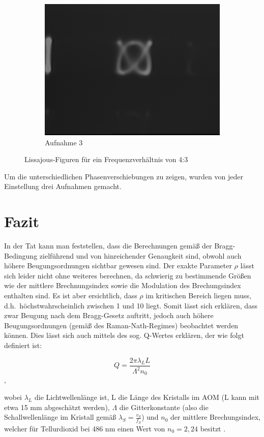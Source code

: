 \documentclass[bigchapter,colorback,accentcolor=tud4b,linedtoc,11pt]{tudreport}
\begin{document}
\begin{figure}[H]
\begin{subfigure}[h]{0.32\textwidth}
    \includegraphics[width=\textwidth]{data/Aufgabe7/4-3-y.png}
    \caption[Cap for listoffigures]{Aufnahme 3}
  \end{subfigure}%
  \caption{Lissajous-Figuren für ein Frequenzverhältnis von 4:3}
\end{figure}

Um die unterschiedlichen Phasenverschiebungen zu zeigen, wurden von jeder Einstellung drei Aufnahmen gemacht.


\chapter{Fazit}

In der Tat kann man feststellen, dass die Berechnungen gemäß der Bragg-Bedingung zielführend und von hinreichender Genaugkeit sind, obwohl auch höhere Beugungsordnungen sichtbar gewesen sind. Der exakte Parameter $\rho$ lässt sich leider nicht ohne weiteres berechnen, da schwierig zu bestimmende Größen wie der mittlere Brechnungsindex sowie die Modulation des Brechungsindex enthalten sind. Es ist aber ersichtlich, dass $\rho$ im kritischen Bereich liegen muss, d.h.\ höchstwahrscheinlich zwischen 1 und 10 liegt. Somit lässt sich erklären, dass zwar Beugung nach dem Bragg-Gesetz auftritt, jedoch auch höhere Beugungsordnungen (gemäß des Raman-Nath-Regimes) beobachtet werden können. Dies lässt sich auch mittels des sog. Q-Wertes erklären, der wie folgt definiert ist: 

$$Q = \frac{2 \pi \lambda_L L}{\Lambda^2 n_0}$$,

wobei $\lambda_L$ die Lichtwellenlänge ist, L die Länge des Kristalls im AOM (L kann mit etwa 15 mm abgeschätzt werden), $\Lambda$ die Gitterkonstante (also die Schallwellenlänge im Kristall gemäß $\lambda_S = \frac{v_S}{f_S}$) und $n_0$ der mittlere Brechungsindex, welcher für Tellurdioxid bei 486 nm einen Wert von $n_0 = 2,24$ besitzt \cite{wiki}.
\end{document}
